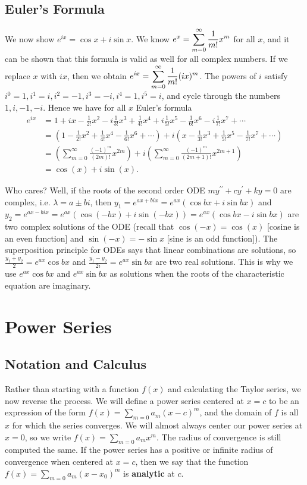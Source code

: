 \subsection{Euler's Formula}
We now show $e^{ix}=\cos x+i\sin x$.  We know $\displaystyle e^x = \sum_{m=0}^\infty\frac{1}{m!}x^m$ for all $x$, and it can be shown that this formula is valid as well for all complex numbers.  If we replace $x$ with $ix$, then we obtain $\displaystyle e^{ix} = \sum_{m=0}^\infty\frac{1}{m!}(ix)^m$.  The powers of $i$ satisfy $i^0=1, i^1=i, i^2=-1, i^3=-i, i^4=1, i^5=i$, and cycle through the numbers $1,i,-1,-i$.  Hence we have for all $x$ Euler's formula
\begin{align*}
e^{ix} 
&= 1+ix-\frac{1}{2!}x^2-i\frac{1}{3!}x^3+\frac{1}{4!}x^4+i\frac{1}{5!}x^5-\frac{1}{6!}x^6-i\frac{1}{7!}x^7+\cdots\\
&= \left(1-\frac{1}{2!}x^2+\frac{1}{4!}x^4-\frac{1}{6!}x^6+\cdots\right)
+i\left(x-\frac{1}{3!}x^3+\frac{1}{5!}x^5-\frac{1}{7!}x^7+\cdots\right)\\
&= \left(\sum_{m=0}^\infty \frac{(-1)^m}{(2m)!}x^{2m}\right)
+i\left(\sum_{m=0}^\infty \frac{(-1)^m}{(2m+1)!}x^{2m+1}\right)\\
&= \cos(x)+i\sin(x).
\end{align*} 

Who cares?  Well, if the roots of the second order ODE $my^{\prime\prime}+cy^\prime+ky=0$ are complex, i.e. $\lambda=a\pm b i$, then $y_1=e^{a x+ b ix} =e^{a x}(\cos b x+ i\sin b x)$ and $y_2=e^{a x-b i x}=e^{a x}(\cos (-bx)+i\sin(-b x)) = e^{a x}(\cos b x-i\sin b x)$ are two complex solutions of the ODE (recall that $\cos (-x)=\cos (x)$ [cosine is an even function] and $\sin(-x)=-\sin x$ [sine is an odd function]). The superposition principle for ODEs says that linear combinations are solutions, so $\frac{y_1+y_2}{2} = e^{a x}\cos b x$ and $\frac{y_1-y_2}{2i} = e^{a x}\sin b x$ are two real solutions.  This is why we use $e^{a x}\cos b x$ and $e^{a x}\sin b x$ as solutions when the roots of the characteristic equation are imaginary.

\section{Power Series}
\subsection{Notation and Calculus}
Rather than starting with a function $f(x)$ and calculating the Taylor series, we now reverse the process.  We will define a power series centered at $x=c$ to be an expression of the form $f(x) = \sum_{m=0}a_m (x-c)^m$, and the domain of $f$ is all $x$ for which the series converges. We will almost always center our power series at $x=0$, so we write $f(x) = \sum_{m=0}a_m x^m$. The radius of convergence is still computed the same. 
If the power series has a positive or infinite radius of convergence when centered at $x=c$, then we say that the function $f(x)= \sum_{m=0}a_m (x-x_0)^m$ is \textbf{analytic} at $c$. 

